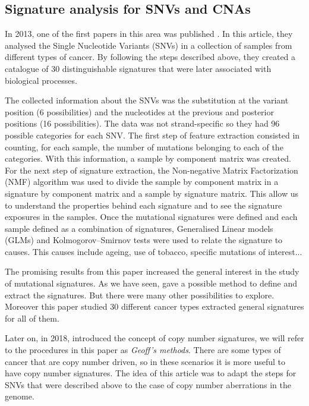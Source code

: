 \documentclass[a4paper]{article}
\begin{document}
\subsection{Signature analysis for SNVs and CNAs}

In 2013, one of the first papers in this area was published \cite{Alex}. In this article, they analysed the Single Nucleotide Variants (SNVs) in a collection of samples from different types of cancer. By following the steps described above, they created a catalogue of 30 distinguishable signatures that were later associated with biological processes. 

The collected information about the SNVs was the substitution at the variant position (6 possibilities) and the nucleotides at the previous and posterior positions (16 possibilities). The data was not strand-specific so they had 96 possible categories for each SNV. The first step of feature extraction consisted in counting, for each sample, the number of mutations belonging to each of the categories. With this information, a sample by component matrix was created. For the next step of signature extraction, the Non-negative Matrix Factorization (NMF) algorithm was used to divide the sample by component matrix in a signature by component matrix and a sample by signature matrix. This allow us to understand the properties behind each signature and to see the signature exposures in the samples. Once the mutational signatures were defined and each sample defined as a combination of signatures, Generalised Linear models (GLMs) and Kolmogorov–Smirnov tests were used to relate the signature to causes. This causes include ageing, use of tobacco, specific mutations of interest... 

The promising results from this paper increased the general interest in the study of mutational signatures. As we have seen, \cite{Alex} gave a possible method to define and extract the signatures. But there were many other possibilities to explore. Moreover this paper studied 30 different cancer types extracted general signatures for all of them. 

Later on, in 2018, \cite{Geoff} introduced the concept of copy number signatures, we will refer to the procedures in this paper as \textit{Geoff's methods}. There are some types of cancer that are copy number driven, so in these scenarios it is more useful to have copy number signatures. The idea of this article was to adapt the steps for SNVs that were described above to the case of copy number aberrations in the genome. 
\end{document}
